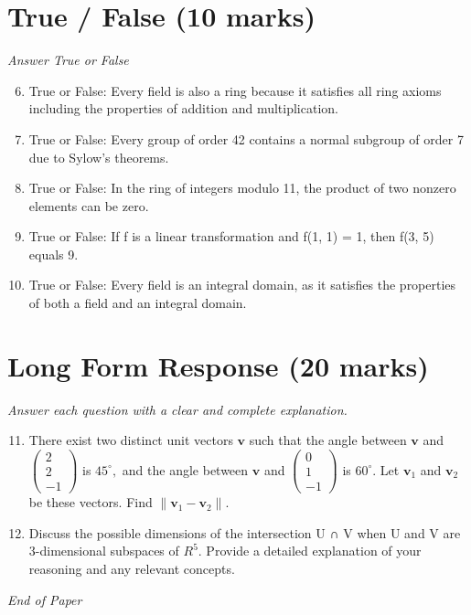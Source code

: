 \documentclass[12pt]{article}
\begin{document}
\section*{True / False (10 marks)}
\textit{Answer True or False}
\begin{enumerate}[label=\arabic*.]
\setcounter{enumi}{5}
\item True or False: Every field is also a ring because it satisfies all ring axioms including the properties of addition and multiplication.
\item True or False: Every group of order 42 contains a normal subgroup of order 7 due to Sylow's theorems.
\item True or False: In the ring of integers modulo 11, the product of two nonzero elements can be zero.
\item True or False: If f is a linear transformation and f(1, 1) = 1, then f(3, 5) equals 9.
\item True or False: Every field is an integral domain, as it satisfies the properties of both a field and an integral domain.
\end{enumerate}

\section*{Long Form Response (20 marks)}
\textit{Answer each question with a clear and complete explanation.}
\begin{enumerate}[label=\arabic*.]
\setcounter{enumi}{10}
\item There exist two distinct unit vectors $\mathbf{v}$ such that the angle between $\mathbf{v}$ and $\begin{pmatrix} 2 \\ 2 \\ -1 \end{pmatrix}$ is $45^\circ,$ and the angle between $\mathbf{v}$ and $\begin{pmatrix} 0 \\ 1 \\ -1 \end{pmatrix}$ is $60^\circ.$ Let $\mathbf{v}_1$ and $\mathbf{v}_2$ be these vectors. Find $\|\mathbf{v}_1 - \mathbf{v}_2\|.$
\item Discuss the possible dimensions of the intersection U ∩ V when U and V are 3-dimensional subspaces of $R^5$. Provide a detailed explanation of your reasoning and any relevant concepts.
\end{enumerate}

\vfill
\noindent\textit{End of Paper}
\end{document}
